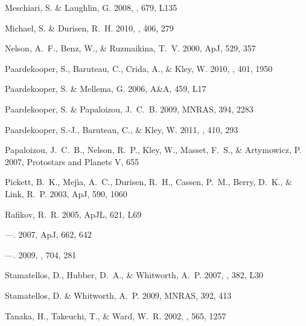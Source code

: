 \documentclass[12pt,manuscript,authoryear]{aastex}
\begin{document}
\begin{thebibliography}{48}
{Meschiari}, S. \& {Laughlin}, G. 2008, \apjl, 679, L135

{Michael}, S. \& {Durisen}, R.~H. 2010, \mnras, 406, 279

{Nelson}, A.~F., {Benz}, W., \& {Ruzmaikina}, T.~V. 2000, ApJ, 529, 357

{Paardekooper}, S., {Baruteau}, C., {Crida}, A., \& {Kley}, W. 2010, \mnras,
  401, 1950

{Paardekooper}, S. \& {Mellema}, G. 2006, A\&A, 459, L17

{Paardekooper}, S. \& {Papaloizou}, J.~C.~B. 2009, MNRAS, 394, 2283

{Paardekooper}, S.-J., {Baruteau}, C., \& {Kley}, W. 2011, \mnras, 410, 293

{Papaloizou}, J.~C.~B., {Nelson}, R.~P., {Kley}, W., {Masset}, F.~S., \&
  {Artymowicz}, P. 2007, Protostars and Planets V, 655

{Pickett}, B.~K., {Mej{\'{\i}}a}, A.~C., {Durisen}, R.~H., {Cassen}, P.~M.,
  {Berry}, D.~K., \& {Link}, R.~P. 2003, ApJ, 590, 1060

{Rafikov}, R.~R. 2005, ApJL, 621, L69

---. 2007, ApJ, 662, 642

---. 2009, \apj, 704, 281

{Stamatellos}, D., {Hubber}, D.~A., \& {Whitworth}, A.~P. 2007, \mnras, 382,
  L30

{Stamatellos}, D. \& {Whitworth}, A.~P. 2009, MNRAS, 392, 413

{Tanaka}, H., {Takeuchi}, T., \& {Ward}, W.~R. 2002, \apj, 565, 1257


\end{thebibliography}
\end{document}
